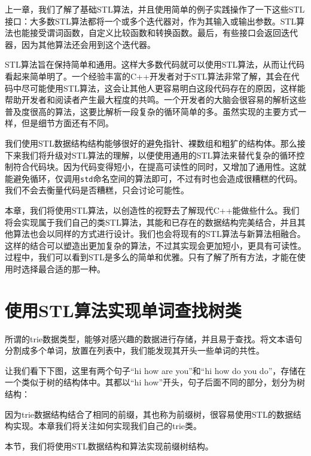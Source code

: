 上一章，我们了解了基础STL算法，并且使用简单的例子实践操作了一下这些STL接口：大多数STL算法都将一个或多个迭代器对，作为其输入或输出参数。STL算法也能接受谓词函数，自定义比较函数和转换函数。最后，有些接口会返回迭代器，因为其他算法还会用到这个迭代器。

STL算法旨在保持简单和通用。这样大多数代码就可以使用STL算法，从而让代码看起来简单明了。一个经验丰富的C++开发者对于STL算法非常了解，其会在代码中尽可能使用STL算法，这会让其他人更容易明白这段代码存在的原因，这样能帮助开发者和阅读者产生最大程度的共鸣。一个开发者的大脑会很容易的解析这些普及度很高的算法，这要比解析一段复杂的循环简单的多。虽然实现的主要方式一样，但是细节方面还有不同。

我们使用STL数据结构结构能够很好的避免指针、裸数组和粗犷的结构体。那么接下来我们将升级对STL算法的理解，以便使用通用的STL算法来替代复杂的循环控制符合代码块。因为代码变得短小，在提高可读性的同时，又增加了通用性。这就能避免循环，仅调用\texttt{std}命名空间的算法即可，不过有时也会造成很糟糕的代码。我们不会去衡量代码是否糟糕，只会讨论可能性。

本章，我们将使用STL算法，以创造性的视野去了解现代C++能做些什么。我们将会实现属于我们自己的类STL算法，其能和已存在的数据结构完美结合，并且其他算法也会以同样的方式进行设计。我们也会将现有的STL算法与新算法相融合。这样的结合可以塑造出更加复杂的算法，不过其实现会更加短小，更具有可读性。过程中，我们可以看到STL是多么的简单和优雅。只有了解了所有方法，才能在使用时选择最合适的那一种。


\section{使用STL算法实现单词查找树类}

所谓的trie数据类型，能够对感兴趣的数据进行存储，并且易于查找。将文本语句分割成多个单词，放置在列表中，我们能发现其开头一些单词的共性。

让我们看下下图，这里有两个句子“hi how are you”和“hi how do you do”，存储在一个类似于树的结构体中。其都以“hi how”开头，句子后面不同的部分，划分为树结构：


因为trie数据结构结合了相同的前缀，其也称为前缀树，很容易使用STL的数据结构实现。本章我们将关注如何实现我们自己的trie类。


本节，我们将使用STL数据结构和算法实现前缀树结构。

